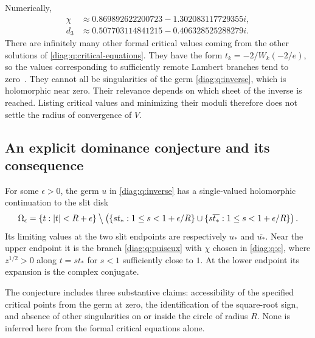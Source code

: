 Numerically,
\begin{align*}
 \chi&\approx0.869892622200723-1.302083117729355i,\\
 d_3&\approx0.507703114841215-0.406328525288279i.
\end{align*}
There are infinitely many other formal critical values coming from the
other solutions of \eqref{diag:q:critical-equations}.  They have the form
$t_k=-2/W_k(-2/e)$, so the values corresponding to sufficiently remote
Lambert branches tend to zero~\cite[\S4.13]{DLMF}.
They cannot all be singularities of the germ \eqref{diag:q:inverse},
which is holomorphic near zero.  Their relevance depends on which sheet
of the inverse is reached.  Listing critical values and minimizing their
moduli therefore does not settle the radius of convergence of $V$.

\subsection{An explicit dominance conjecture and its consequence}
\label{diag:q:dominance-subsection}

\begin{conjecture}[Accessible dominant conjugate pair for $A=2$]
\label{diag:q:dominance}
For some $\epsilon>0$, the germ $u$ in \eqref{diag:q:inverse} has a
single-valued holomorphic continuation to the slit disk
\begin{equation}\label{diag:q:domain}
 \Omega_\epsilon=\{t:|t|<R+\epsilon\}
 \mathbin{\big\backslash}
 \left(
  \{s t_*:1\leq s<1+\epsilon/R\}
   \cup
  \{s\overline{t_*}:1\leq s<1+\epsilon/R\}
 \right).
\end{equation}
Its limiting values at the two slit endpoints are respectively $u_*$
and $\overline{u_*}$.  Near the upper endpoint it is the branch
\eqref{diag:q:puiseux} with $\chi$ chosen in \eqref{diag:q:c}, where
$z^{1/2}>0$ along $t=s t_*$ for $s<1$ sufficiently close to $1$.
At the lower endpoint its expansion is the complex conjugate.
\end{conjecture}

The conjecture includes three substantive claims: accessibility of the
specified critical points from the germ at zero, the identification of the
square-root sign, and absence of other singularities on or inside the
circle of radius $R$.  None is inferred here from the formal critical
equations alone.

